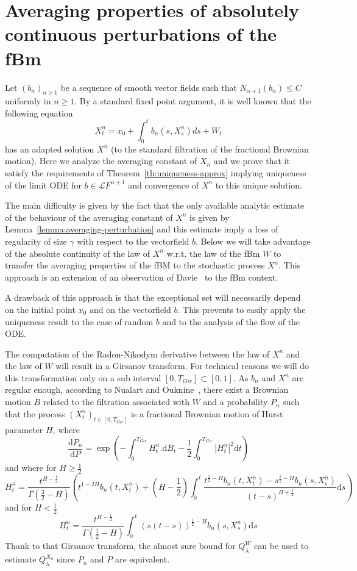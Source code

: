 \documentclass[11pt,a4paper,draft,reqno]{amsart}
\theoremstyle{definition}
\newcommand{\cL}{\mathcal{L}}
\newcommand{\dd}{\mathrm{d}}
\begin{document}
\section{Averaging properties of absolutely continuous perturbations of the fBm}

Let $(b_n)_{n\ge 1}$ be a sequence of smooth vector fields such that $N_{\alpha+1}(b_n) \le C$ uniformly in $n\ge 1$. By a standard fixed point argument, it is well known that the following equation
\begin{equation}
X^n_t = x_0 + \int_{0}^t b_n(s,X^n_s)ds + W_t
\end{equation}
has an adapted solution $X^n$  (to the standard filtration of the fractional Brownian motion). 
Here we analyze the averaging constant of $X_n$ and we prove that it satisfy the requirements of Theorem~\ref{th:uniqueness-approx} implying uniqueness of the limit ODE for $b\in \cL F^{\alpha+1}$ and convergence of $X^n$ to this unique solution.

\bigskip
The main difficulty is given by the fact that the only available analytic estimate of the behaviour of the averaging constant of $X^n$ is given by Lemma~\ref{lemma:averaging-perturbation} and this estimate imply a loss of regularity of size $\gamma$ with respect to the vectorfield $b$. Below we will take advantage of the absolute continuity of the law of $X^n$ w.r.t. the law of the fBm $W$ to transfer the averaging properties of the fBM to the stochastic process $X^n$. This approach is an extension of an observation of Davie~\cite{MR2377011} to the fBm context. 

A drawback of this approach is that the exceptional set will necessarily depend on the initial point $x_0$ and on the vectorfield $b$. This prevents to easily apply the uniqueness result to the case of random $b$ and to the analysis of the flow of the ODE.

\bigskip
The computation of the Radon-Nikodym derivative between the law of $X^n$ and the law of $W$ will result in a Girsanov transform. For technical reasons we will do this transformation only on a sub interval $[0,T_{Gir}]\subset[0,1]$. As $b_n$ and $X^n$ are regular enough, according to Nualart and Ouknine~\cite{MR1934157}, there exist a Brownian motion $B$ related to the filtration associated with $W$ and a probability $P_n$ such that the process $(X^n_t)_{t\in[0,T_{Gir}]}$ is a fractional Brownian motion of Hurst parameter $H$, where
$$\frac{\dd P_n}{\dd P} = \exp\left(-\int_0^{T_{Gir}}H_t^n.\dd B_t-\frac12\int_0^{T_{Gir}}\left|H^n_t\right|^2\dd t\right)$$
and where for $H\ge\frac12$
$$H_t^n=\frac{t^{H-\frac12}}{\Gamma(\frac32-H)}\left(t^{1-2H}b_n(t,X^n_t) + \left(H-\frac12\right)\int_0^t\frac{t^{\frac12-H}b_n(t,X^n_t)-s^{\frac12-H}b_n(s,X^n_s)}{(t-s)^{H+\frac12}}\dd s\right)$$
and for $H<\frac12$
$$H_t^n = \frac{t^{H-\frac12}}{\Gamma(\frac12-H)}\int_0^t\left(s(t-s)\right)^{\frac12-H}b_n(s,X^n_s)\dd s$$
Thank to that Girsanov transform, the almost sure bound for $Q^W_\lambda$ can be used to estimate $Q^{X_n}_\lambda$ since $P_n$ and $P$ are equivalent. 
\end{document}
